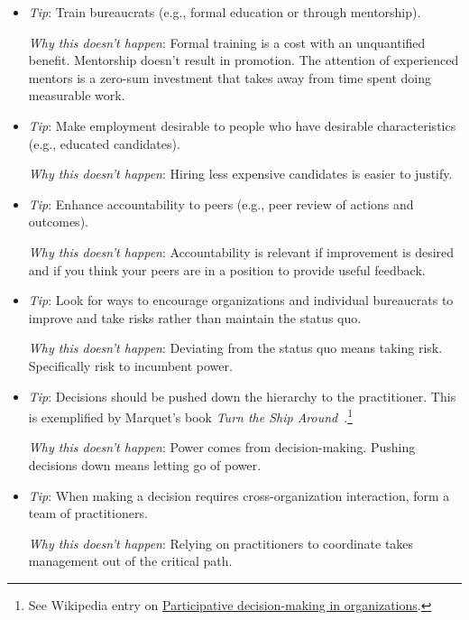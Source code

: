 \begin{itemize}
    \item \textit{Tip}: Train bureaucrats (e.g., formal education or through mentorship).

    \textit{Why this doesn't happen}: Formal training is a cost with an unquantified benefit. Mentorship doesn't result in promotion. The attention of experienced mentors is a zero-sum investment that takes away from time spent doing measurable work.
    
    \item \textit{Tip}: Make employment desirable to people who have desirable characteristics (e.g., educated candidates).

    \textit{Why this doesn't happen}: Hiring less expensive candidates is easier to justify. 
    
    \item \textit{Tip}: Enhance accountability to peers (e.g., peer review of actions and outcomes).

    \textit{Why this doesn't happen}: Accountability is relevant if improvement is desired and if you think your peers are in a position to provide useful feedback. 
    
    \item \textit{Tip}: Look for ways to encourage organizations and individual bureaucrats to improve and take risks rather than maintain the status quo.

    \textit{Why this doesn't happen}: Deviating from the status quo means taking risk. Specifically risk to incumbent power. 
    
    \item \textit{Tip}: Decisions should be pushed down the hierarchy to the practitioner. This is exemplified by Marquet's book \textit{Turn the Ship Around}~\cite{2013_Marquet}.\footnote{See Wikipedia entry on \href{https://en.wikipedia.org/wiki/Participative_decision-making_in_organizations}{Participative decision-making in organizations}.
    }

    \textit{Why this doesn't happen}: Power comes from decision-making. Pushing decisions down means letting go of power.
    
    \item \textit{Tip}: When making a decision requires cross-organization interaction, form a team of practitioners.

    \textit{Why this doesn't happen}: Relying on practitioners to coordinate takes management out of the critical path. 
    

\end{itemize}
